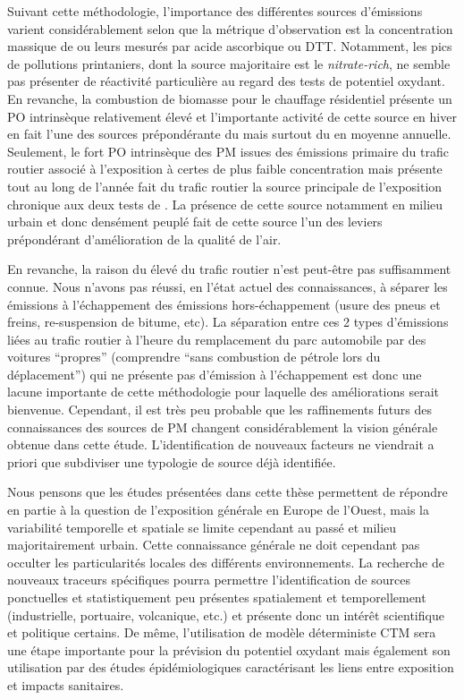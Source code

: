 Suivant cette méthodologie, l'importance des différentes sources d'émissions varient
considérablement selon que la métrique d'observation est la concentration massique de
\PMdix{} ou leurs \POv{} mesurés par acide ascorbique ou DTT. Notamment, les pics de
pollutions printaniers, dont la source majoritaire est le \textit{nitrate-rich}, ne semble
pas présenter de réactivité particulière au regard des tests de potentiel oxydant. En
revanche, la combustion de biomasse pour le chauffage résidentiel présente un PO
intrinsèque relativement élevé et l'importante activité de cette source en hiver en fait l'une des
sources prépondérante du \PODTTv{} mais surtout du \POAAv{} en moyenne annuelle.  Seulement,
le fort PO intrinsèque des PM issues des émissions primaire du trafic routier associé à
l'exposition à certes de plus faible concentration mais présente tout au long de l'année
fait du trafic routier la source principale de l'exposition chronique aux deux tests de
\POv.  La présence de cette source notamment en milieu urbain et donc densément
peuplé fait de cette source l'un des leviers prépondérant d'amélioration de la qualité de
l'air.

En revanche, la raison du \POv{} élevé du trafic routier n'est peut-être pas suffisamment
connue.
Nous n'avons pas réussi, en l'état actuel des connaissances, à séparer les émissions à
l'échappement des émissions hors-échappement (usure des pneus et freins, re-suspension de
bitume, etc). 
La séparation entre ces 2 types d'émissions liées au trafic routier à l'heure du
remplacement du parc automobile par des voitures ``propres'' (comprendre ``sans combustion
de pétrole lors du déplacement'') qui ne présente pas d'émission à l'échappement 
est donc une lacune importante de cette méthodologie pour laquelle des améliorations
serait bienvenue.
Cependant, il est très peu probable que les raffinements futurs des connaissances des sources de
PM changent considérablement la vision générale obtenue dans cette étude. L'identification de nouveaux
facteurs ne viendrait a priori que subdiviser une typologie de source déjà identifiée.

Nous pensons que les études présentées dans cette thèse permettent de répondre en partie à
la question de l'exposition générale en Europe de l'Ouest, mais la variabilité temporelle
et spatiale se limite cependant au passé et milieu majoritairement urbain.
Cette connaissance générale ne doit cependant pas occulter les particularités locales des
différents environnements.
La recherche de nouveaux traceurs spécifiques pourra permettre l'identification de sources
ponctuelles et statistiquement peu présentes spatialement et temporellement
(industrielle, portuaire, volcanique, etc.) et présente donc un intérêt scientifique et
politique certains.
De même, l'utilisation de modèle déterministe CTM sera une étape importante pour la
prévision du potentiel oxydant mais également son utilisation par des études
épidémiologiques caractérisant les liens entre exposition et impacts sanitaires.


